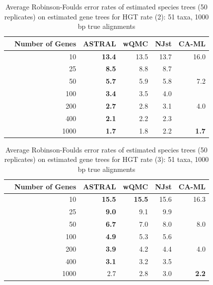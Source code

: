 \begin{table}[h!]
\caption[Error rates of estimated species trees (50 replicates)  on estimated gene trees for HGT rate 2]{Average Robinson-Foulds error rates of estimated species trees (50 replicates)  on estimated gene trees for HGT rate (2): 51 taxa, 1000 bp true alignments}
\begin{tabular}{rrrrrr}
 & Number of Genes & ASTRAL & wQMC   & NJst & CA-ML\\
\hline
 & 10 & \textbf{13.4} & 13.5 &   13.7 & 16.0 \\
 & 25 & \textbf{8.5} & 8.8 &  8.7 & \\
 & 50 & \textbf{5.7} & 5.9 & 5.8 & 7.2\\
 & 100 & \textbf{3.4} & 3.5  & 4.0 & \\
 & 200 & \textbf{2.7} & 2.8   & 3.1 & 4.0\\
 & 400 & \textbf{2.1} & 2.2   & 2.3 & \\
 & 1000 & \textbf{1.7} & 1.8   & 2.2 & \textbf{1.7} \\
\end{tabular}
\label{hgt::table2}
\end{table}

\begin{table}[h!]
\caption[Error rates of estimated species trees (50 replicates)  on estimated gene trees for HGT rate 3]{Average Robinson-Foulds error rates of estimated species trees (50 replicates)  on estimated gene trees for HGT rate (3): 51 taxa, 1000 bp true alignments}
\begin{tabular}{rrrrrr}
 & Number of Genes & ASTRAL & wQMC   & NJst  & CA-ML\\
\hline
 & 10 & \textbf{15.5} & \textbf{15.5} &   15.6 & 16.3\\
 & 25 & \textbf{9.0} & 9.1 &  9.9 & \\
 & 50 & \textbf{6.7} & 7.0  & 8.0 & 8.0 \\
 & 100 & \textbf{4.9} & 5.3   & 5.6 & \\
 & 200 & \textbf{3.9} & 4.2   & 4.4 & 4.0 \\
 & 400 & \textbf{3.1} & 3.2   & 3.5 & \\
 & 1000 & 2.7 & 2.8 &   3.0 & \textbf{2.2} \\
\end{tabular}
\label{hgt::table3}
\end{table}

